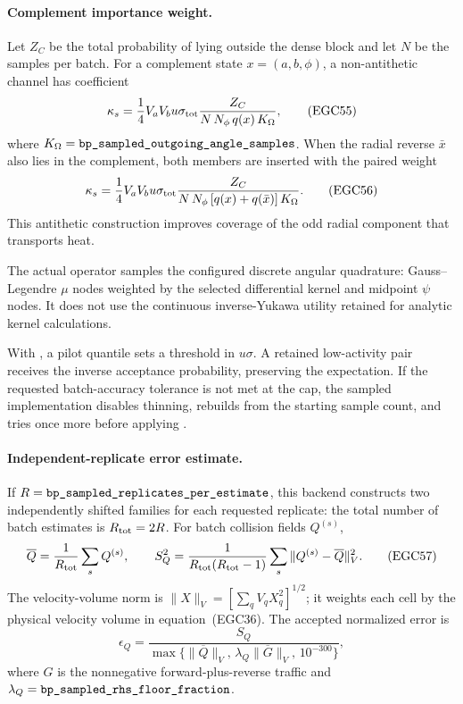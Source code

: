 \paragraph{Complement importance weight.}
Let \(Z_C\) be the total probability of lying outside the dense block and let
\(N\) be the samples per batch.  For a complement state
\(x=(a,b,\phi)\), a non-antithetic channel has coefficient
\[
 \kappa_s=
 \frac14V_aV_bu\sigma_{\rm tot}
 \frac{Z_C}
 {N\,N_\phi\,q(x)\,K_\Omega},                            \tag{EGC55}
\]
where \(K_\Omega=\code{bp_sampled_outgoing_angle_samples}\).
When the radial reverse \(\bar x\) also lies in the complement, both members
are inserted with the paired weight
\[
 \kappa_s=
 \frac14V_aV_bu\sigma_{\rm tot}
 \frac{Z_C}
 {N\,N_\phi\,[q(x)+q(\bar x)]\,K_\Omega}.                \tag{EGC56}
\]
This antithetic construction improves coverage of the odd radial component
that transports heat.

The actual operator samples the configured discrete angular quadrature:
Gauss--Legendre \(\mu\) nodes weighted by the selected differential kernel and
midpoint \(\psi\) nodes.  It does not use the continuous inverse-Yukawa
utility retained for analytic kernel calculations.

With , a pilot quantile sets a
threshold in \(u\sigma\).  A retained low-activity pair receives the inverse
acceptance probability, preserving the expectation.  If the requested
batch-accuracy tolerance is not met at the cap, the sampled implementation
disables thinning, rebuilds from the starting sample count, and tries once
more before applying .

\paragraph{Independent-replicate error estimate.}
If \(R=\code{bp_sampled_replicates_per_estimate}\), this backend constructs two
independently shifted families for each requested replicate: the total number
of batch estimates is \(R_{\rm tot}=2R\).  For batch collision fields
\(Q^{(s)}\),
\[
 \overline Q=\frac1{R_{\rm tot}}\sum_sQ^{(s)},\qquad
 S_Q^2=
 \frac1{R_{\rm tot}(R_{\rm tot}-1)}
 \sum_s\|Q^{(s)}-\overline Q\|_V^2.                      \tag{EGC57}
\]
The velocity-volume norm is
\(\|X\|_V=[\sum_qV_qX_q^2]^{1/2}\); it weights each cell by the physical
velocity volume in equation~(EGC36).
The accepted normalized error is
\[
 \epsilon_Q=
 \frac{S_Q}
 {\max\{\|\overline Q\|_V,\,
 \lambda_Q\|\overline G\|_V,\,10^{-300}\}},              \tag{EGC58}
\]
where \(G\) is the nonnegative forward-plus-reverse traffic and
\(\lambda_Q=\code{bp_sampled_rhs_floor_fraction}\).

